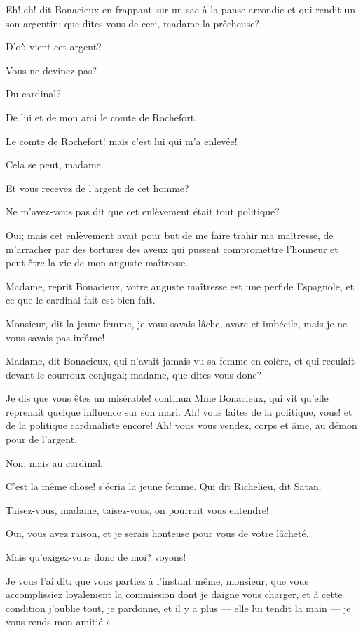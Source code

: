 \speak  Eh! eh! dit Bonacieux en frappant sur un sac à la panse arrondie et qui rendit un son argentin; que dites-vous de ceci, madame la prêcheuse? 

\speak  D'où vient cet argent? 

\speak  Vous ne devinez pas? 

\speak  Du cardinal? 

\speak  De lui et de mon ami le comte de Rochefort. 

\speak  Le comte de Rochefort! mais c'est lui qui m'a enlevée! 

\speak  Cela se peut, madame. 

\speak  Et vous recevez de l'argent de cet homme? 

\speak  Ne m'avez-vous pas dit que cet enlèvement était tout politique? 

\speak  Oui; mais cet enlèvement avait pour but de me faire trahir ma maîtresse, de m'arracher par des tortures des aveux qui pussent compromettre l'honneur et peut-être la vie de mon auguste maîtresse. 

\speak  Madame, reprit Bonacieux, votre auguste maîtresse est une perfide Espagnole, et ce que le cardinal fait est bien fait. 

\speak  Monsieur, dit la jeune femme, je vous savais lâche, avare et imbécile, mais je ne vous savais pas infâme! 

\speak  Madame, dit Bonacieux, qui n'avait jamais vu sa femme en colère, et qui reculait devant le courroux conjugal; madame, que dites-vous donc? 

\speak  Je dis que vous êtes un misérable! continua Mme Bonacieux, qui vit qu'elle reprenait quelque influence sur son mari. Ah! vous faites de la politique, vous! et de la politique cardinaliste encore! Ah! vous vous vendez, corps et âme, au démon pour de l'argent. 

\speak  Non, mais au cardinal. 

\speak  C'est la même chose! s'écria la jeune femme. Qui dit Richelieu, dit Satan. 

\speak  Taisez-vous, madame, taisez-vous, on pourrait vous entendre! 

\speak  Oui, vous avez raison, et je serais honteuse pour vous de votre lâcheté. 

\speak  Mais qu'exigez-vous donc de moi? voyons! 

\speak  Je vous l'ai dit: que vous partiez à l'instant même, monsieur, que vous accomplissiez loyalement la commission dont je daigne vous charger, et à cette condition j'oublie tout, je pardonne, et il y a plus --- elle lui tendit la main --- je vous rends mon amitié.» 


